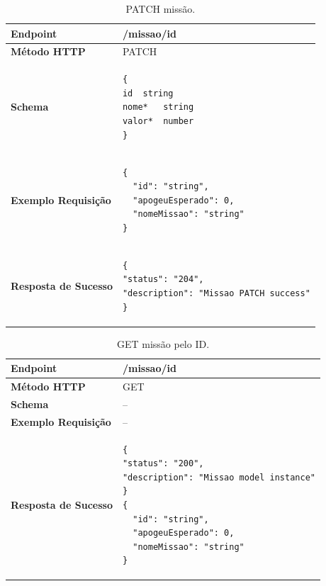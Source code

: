\begin{apendicesenv}

\begin{table}[H]
\begin{tabular}{|l|l|}
\hline
\textbf{Endpoint}            & /missao/{id} \\ \hline
\textbf{Método HTTP}         & PATCH \\ \hline
\textbf{Schema}              &  
\begin{lstlisting}
{
id	string
nome*	string
valor*	number
}
\end{lstlisting}\\ \hline
\textbf{Exemplo Requisição}  &  
\begin{lstlisting}
{
  "id": "string",
  "apogeuEsperado": 0,
  "nomeMissao": "string"
}
\end{lstlisting} \\ \hline
\textbf{Resposta de Sucesso} &
\begin{lstlisting}
{
"status": "204",
"description": "Missao PATCH success"
}
\end{lstlisting}
\\ \hline
\end{tabular}
\caption{PATCH missão.}
\label{patch_missao}
\end{table}


\begin{table}[H]
\begin{tabular}{|l|l|}
\hline
\textbf{Endpoint}            & /missao/{id} \\ \hline
\textbf{Método HTTP}         & GET \\ \hline
\textbf{Schema}              & -- \\ \hline
\textbf{Exemplo Requisição}  & -- \\ \hline
\textbf{Resposta de Sucesso} &
\begin{lstlisting}
{
"status": "200",
"description": "Missao model instance"
}
{
  "id": "string",
  "apogeuEsperado": 0,
  "nomeMissao": "string"
}
\end{lstlisting}
\\ \hline
\end{tabular}
\caption{GET missão pelo ID.}
\label{get_missao_id}
\end{table}



\end{apendicesenv}
